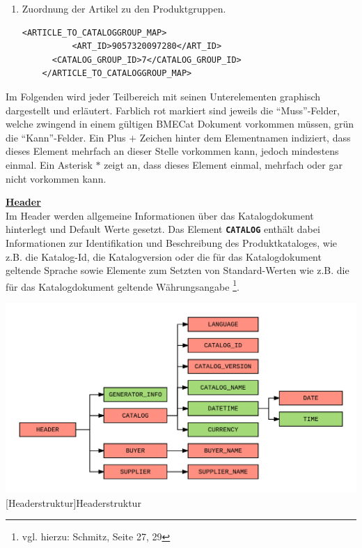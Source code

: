 \begin{enumerate}
\item Zuordnung der Artikel zu den Produktgruppen.
\begin{lstlisting}[caption={Zuordnung der Artikel zu den Produktgruppen in einem BMECat-Dokument }] 
	<ARTICLE_TO_CATALOGGROUP_MAP>
          <ART_ID>9057320097280</ART_ID>
	  <CATALOG_GROUP_ID>7</CATALOG_GROUP_ID>
	</ARTICLE_TO_CATALOGGROUP_MAP>
\end{lstlisting}
	
	\end{enumerate}
	
	Im Folgenden wird jeder Teilbereich mit seinen Unterelementen graphisch dargestellt und erläutert. Farblich rot markiert sind jeweils die \enquote{Muss}-Felder, welche zwingend in einem gültigen BMECat Dokument vorkommen müssen, grün die \enquote{Kann}-Felder. Ein Plus \(+\) Zeichen hinter dem Elementnamen indiziert, dass dieses Element mehrfach an dieser Stelle vorkommen kann, jedoch mindestens einmal. Ein Asterisk \(*\) zeigt an, dass dieses Element einmal, mehrfach oder gar nicht vorkommen kann.  
	
	\textbf{\underline{Header}}\\
	Im Header werden allgemeine Informationen über das Katalogdokument hinterlegt und
	 Default Werte gesetzt. Das Element \texttt{\textbf{CATALOG}} enthält dabei	
	Informationen zur Identifikation und Beschreibung des Produktkataloges, wie z.B. die
	 Katalog-Id, die Katalogversion oder die für das Katalogdokument geltende Sprache sowie
	  Elemente zum Setzten von Standard-Werten wie z.B. die für das Katalogdokument geltende Währungsangabe \footnote{vgl. hierzu: Schmitz, Seite 27, 29}.
	
	\begin{minipage}{\linewidth}
		\vspace{1em}
		\centering
		\includegraphics[width=0.85\linewidth]{img/BMECat_Header}
		[Headerstruktur]{Headerstruktur}
		\label{fig:header}
		\vspace{1em}
	\end{minipage}
	

